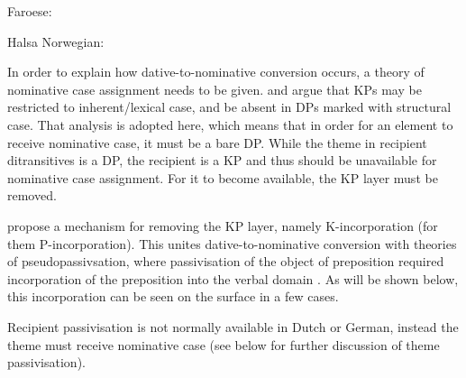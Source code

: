 \begin{exe}
	\ex Faroese:
	\begin{xlist}
	\end{xlist}
	\ex Halsa Norwegian:
	\begin{xlist}
	\end{xlist}
\end{exe}

In order to explain how dative-to-nominative conversion occurs, a theory of nominative case assignment needs to be given. \cite{Bayer.2001} and \cite{Asbury.2007} argue that KPs may be restricted to inherent/lexical case, and be absent in DPs marked with structural case. That analysis is adopted here, which means that in order for an element to receive nominative case, it must be a bare DP. While the theme in recipient ditransitives is a DP, the recipient is a KP and thus should be unavailable for nominative case assignment. For it to become available, the KP layer must be removed.

\cite{Alexiadou.2014} propose a mechanism for removing the KP layer, namely K-incorporation (for them P-incorporation). This unites dative-to-nominative conversion with theories of pseudopassivsation, where passivisation of the object of preposition required incorporation of the preposition into the verbal domain \citep{Herslund.1984}. As will be shown below, this incorporation can be seen on the surface in a few cases.

Recipient passivisation is not normally available in Dutch or German, instead the theme must receive nominative case (see below for further discussion of theme passivisation).


